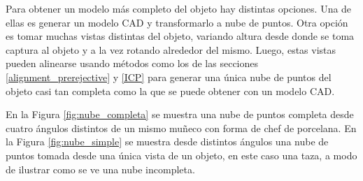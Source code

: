 Para obtener un modelo más completo del objeto hay distintas opciones. Una de ellas es generar un modelo CAD y transformarlo a nube de puntos. Otra opción es tomar muchas vistas distintas del objeto, variando altura desde donde se toma captura al objeto y a la vez rotando alrededor del mismo. Luego, estas vistas pueden alinearse usando métodos como los de las secciones \ref{alignment_prerejective} y \ref{ICP} para generar una única nube de puntos del objeto casi tan completa como la que se puede obtener con un modelo CAD.

En la Figura \ref{fig:nube_completa} se muestra una nube de puntos completa desde cuatro ángulos distintos de un mismo muñeco con forma de chef de porcelana. En la Figura \ref{fig:nube_simple} se muestra desde distintos ángulos una nube de puntos tomada desde una única vista de un objeto, en este caso una taza, a modo de ilustrar como se ve una nube incompleta.

